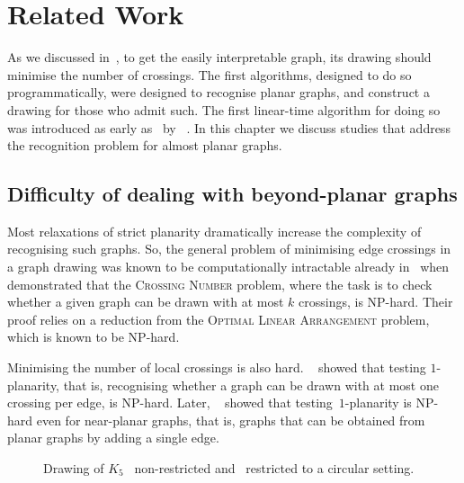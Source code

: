 \chapter{Related Work}\label{ch:related-work}

As we discussed in~, to get the easily interpretable graph, its drawing should minimise the number of crossings. The first algorithms, designed to do so programmatically, were designed to recognise planar graphs, and construct a drawing for those who admit such. The first linear-time algorithm for doing so was introduced as early as~\citeyear{linear-p} by \citeauthor{linear-p}~\cite{linear-p}. In this chapter we discuss studies that address the recognition problem for almost planar graphs.

\section{Difficulty of dealing with beyond-planar graphs}

Most relaxations of strict planarity dramatically increase the complexity of recognising such graphs. So, the general problem of minimising edge crossings in a graph drawing was known to be computationally intractable already in~\citeyear{cr_NPC} when \citeauthor{cr_NPC}~\cite{cr_NPC} demonstrated that the \textsc{Crossing Number} problem, where the task is to check whether a given graph can be drawn with at most \(k\) crossings, is NP-hard. Their proof relies on a reduction from the \textsc{Optimal Linear Arrangement} problem, which is known to be NP-hard.

Minimising the number of local crossings is also hard. \citeauthor{1p-NPH}~\cite{1p-NPH} showed that testing \(1\)-planarity, that is, recognising whether a graph can be drawn with at most one crossing per edge, is NP-hard. Later, \citeauthor{one-edge-NPH}~\cite{one-edge-NPH} showed that testing~\(1\)-planarity is NP-hard even for near-planar graphs, that is, graphs that can be obtained from planar graphs by adding a single edge.

\begin{figure}[tbh]
    \centering
    \captionsetup{subrefformat=parens}
    \caption{Drawing of \(K_5\) ~non-restricted and ~restricted to a circular setting.}
    \label{fig:figure}
\end{figure}

